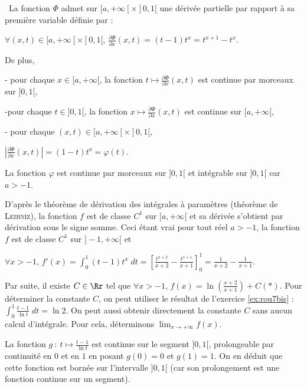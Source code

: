 {{\textbullet~La fonction $\Phi$ admet sur $[a,+\infty[\times]0,1[$ une dérivée partielle par rapport à sa première variable définie par :

\begin{center}
$\forall(x,t)\in[a,+\infty[\times]0,1[$, $\frac{\partial \Phi}{\partial x}(x,t)=(t-1)t^x=t^{x+1}-t^x$.
\end{center}

De plus,

- pour chaque $x\in[a,+\infty[$, la fonction $t\mapsto\frac{\partial \Phi}{\partial x}(x,t)$ est continue par morceaux sur $]0,1[$,

-pour chaque $t\in]0,1[$, la fonction $x\mapsto\frac{\partial \Phi}{\partial x}(x,t)$ est continue sur $[a,+\infty[$,

- pour chaque $(x,t)\in[a,+\infty[\times]0,1[$,

\begin{center}
$\left|\frac{\partial \Phi}{\partial x}(x,t)\right|=(1-t)t^a=\varphi(t)$.
\end{center}

La fonction $\varphi$ est continue par morceaux sur $]0,1[$ et intégrable sur $]0,1[$ car $a>-1$.

D'après le théorème de dérivation des intégrales à paramètres (théorème de \textsc{Leibniz}), la fonction $f$ est de classe $C^1$ sur $[a,+\infty[$ et sa dérivée s'obtient par dérivation sous le signe somme. Ceci étant vrai pour tout réel $a>-1$, la fonction $f$ est de classe $C^1$ sur $]-1,+\infty[$ et

\begin{center}
$\forall x>-1$, $f'(x)=\int_{0}^{1}(t-1)t^x\;dt=\left[\frac{t^{x+2}}{x+2}-\frac{t^{x+1}}{x+1}\right]_0^1=\frac{1}{x+2}-\frac{1}{x+1}$.
\end{center}

Par suite, il existe $C\in\Rr$ tel que $\forall x>-1$, $f(x)=\ln\left(\frac{x+2}{x+1}\right)+C$\quad$(*)$. Pour déterminer la constante $C$, on peut utiliser le résultat de l'exercice \ref{ex:rou7bis} : $\int_{0}^{1}\frac{t-1}{\ln t}\;dt=\ln2$. On peut aussi obtenir directement la constante $C$ sans aucun calcul d'intégrale. Pour cela, déterminons $\lim_{x \rightarrow +\infty}f(x)$.

La fonction $g~:~t\mapsto\frac{t-1}{\ln t}$ est continue sur le segment $]0,1[$, prolongeable par continuité en $0$ et en $1$ en posant $g(0)=0$ et $g(1)=1$. On en déduit que cette fonction est bornée sur l'intervalle $]0,1[$ (car son prolongement est une fonction continue sur un segment).

}}
